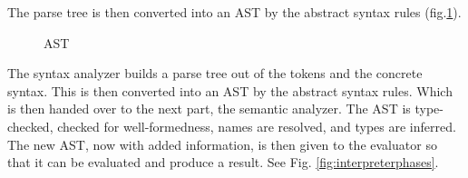 The parse tree is then converted into an \gls{AST} by the abstract syntax rules (fig.\ref{fig:ast}).

\begin{figure}[!h]
    \centering
    \label{fig:ast}
    \caption{AST}
\end{figure}

The syntax analyzer builds a parse tree out of the tokens and the concrete syntax. 
This is then converted into an AST by the abstract syntax rules. 
Which is then handed over to the next part, the \gls{semantic analyzer}.
The AST is type-checked, checked for well-formedness, names are resolved, and types are inferred. The new AST, now with added information, is then given to the evaluator so that it can be evaluated and produce a result.
See Fig. \ref{fig:interpreterphases}.

